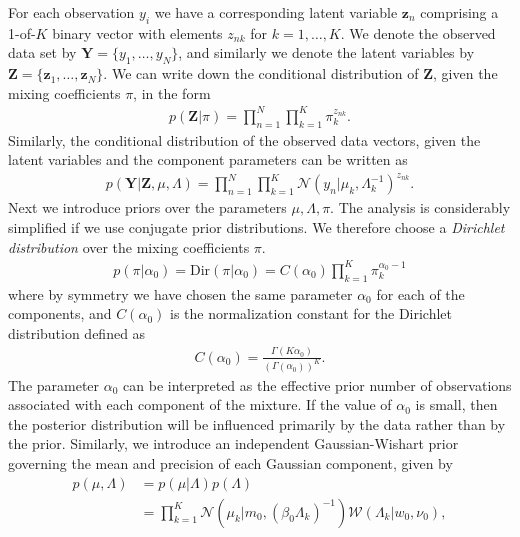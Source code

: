 \documentclass[10pt ]{article}
\begin{document}
For each observation $y_i$ we have a corresponding latent variable $\mathbf{z}_n$ comprising a 1-of-$K$ binary vector with elements $z_{n k}$ for $k = 1, \dots ,K$. We denote the observed data set by $\mathbf{Y} = \{y_1, \dots ,y_N\}$, and similarly we denote the latent variables by $\mathbf{Z} = \{\mathbf{z}_1, \dots, \mathbf{z}_N\}$. We can write down the conditional distribution of $\mathbf{Z}$, given the mixing coefficients $\pi$, in the form
\begin{align}
p ( \mathbf{Z} | \pi) =\prod_{n=1}^N \prod_{k=1}^K \pi_k^{z_{n k}}.
\label{eq_mog_dist_z_modified}
\end{align}
Similarly, the conditional distribution of the observed data vectors, given the latent variables and the component parameters can be written as 
\begin{align}
p ( \mathbf{Y} |  \mathbf{Z} , \mu, \Lambda) =\prod_{n=1}^N \prod_{k=1}^K \mathcal{N} (y_n | \mu_k, \Lambda_k^{-1})^{z_{n k}}. 
\label{eq_mog_dist_cond_z_modified}
\end{align}
Next we introduce priors over the parameters $\mu, \Lambda, \pi$. The analysis is considerably simplified if we use conjugate prior distributions. We therefore choose a {\em Dirichlet distribution} over the mixing coefficients $\pi$.
\begin{align}
p(\pi | \alpha_0 ) = \mathrm{Dir} ( \pi | \alpha_0 ) = C(\alpha_0) \prod_{k=1}^K \pi_k^{\alpha_0 - 1}
\label{eq_dirichlet_dist}
\end{align}
where by symmetry we have chosen the same parameter $\alpha_0$ for each of the components, and $ C(\alpha_0)$ is the normalization constant for the Dirichlet distribution defined as 
\begin{align}
C(\alpha_0) = \frac{\Gamma (K \alpha_0) }{\left( \Gamma (\alpha_0) \right)^K}.
\label{eq_define_c_alpha_0}
\end{align}
The parameter $\alpha_0$ can be interpreted as the effective prior number of observations associated with each component of the mixture. If the value of $\alpha_0$ is small, then the posterior distribution will be influenced primarily by the data rather than by the prior. Similarly, we introduce an independent Gaussian-Wishart prior governing the mean and precision of each Gaussian component, given by
\begin{align}
p (\mu, \Lambda) &= p(\mu | \Lambda) p (\Lambda) \nonumber \\
&= \prod_{k=1}^K \mathcal{N} (\mu_k | m_0, (\beta_0 \Lambda_k)^{-1}) \mathcal{W} (\Lambda_k | w_0, \nu_0),
\label{eq_mog_prior_gauusian_wishart}
\end{align}
\end{document}
